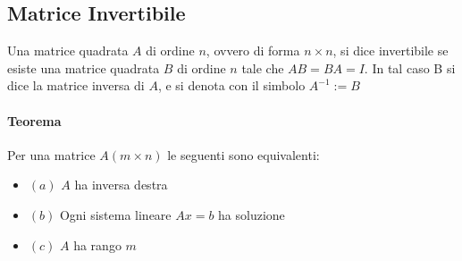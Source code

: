 \documentclass[a4paper, 10pt]{article}
\begin{document}
	\subsection{Matrice Invertibile}
	Una matrice quadrata $A$ di ordine $n$, ovvero di forma $n \times n$, si dice invertibile se esiste una matrice
	quadrata $B$ di ordine $n$ tale che $AB = BA = I$. In  tal caso B si dice la matrice inversa di $A$, e si denota 
	con il simbolo $A^{-1} := B$ 
	\paragraph*{Teorema} Per una matrice $A (m \times n)$ le seguenti sono equivalenti:
	\begin{itemize}
		\item $(a)$ $A$ ha inversa destra
		\item $(b)$ Ogni sistema lineare $Ax = b$ ha soluzione
		\item $(c)$ $A$ ha rango $m$
	\end{itemize}
\end{document}
